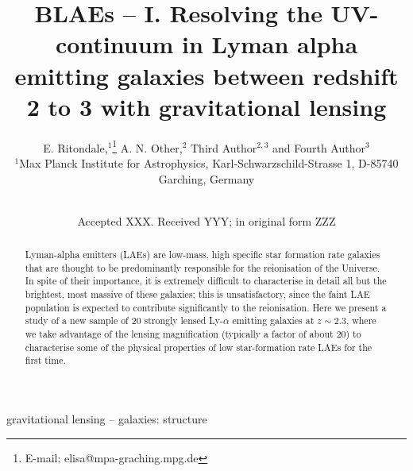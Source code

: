 \documentclass[a4paper,fleqn,usenatbib]{mnras}
\title[BLAEs -- I.]{BLAEs -- I. Resolving the UV-continuum in Lyman alpha emitting galaxies between redshift 2 to 3 with gravitational lensing}
\author[E. Ritondale et al.]{
E. Ritondale,$^{1}$\thanks{E-mail: elisa@mpa-graching.mpg.de}
A. N. Other,$^{2}$
Third Author$^{2,3}$
and Fourth Author$^{3}$
\\
$^{1}$Max Planck Institute for Astrophysics, Karl-Schwarzschild-Strasse 1, D-85740 Garching, Germany\\\\
}
\date{Accepted XXX. Received YYY; in original form ZZZ}
\begin{document}
\label{firstpage}
\pagerange{\pageref{firstpage}--\pageref{lastpage}}
\maketitle

\label{firstpage}

\begin{abstract}
Lyman-alpha emitters (LAEs) are low-mass, high specific star formation rate galaxies that are thought to be predominantly responsible for the reionisation of the Universe. In spite of their importance, it is extremely difficult to characterise in detail all but the brightest, most massive of these galaxies; this is unsatisfactory, since the faint LAE population is expected to contribute significantly to the reionisation. Here we present a study of a new sample of 20 strongly lensed Ly-$\alpha$ emitting galaxies at $z \sim 2.3$, where we take advantage of the lensing magnification (typically a factor of  about 20) to characterise some of the physical properties of low star-formation rate LAEs for the first time.

\end{abstract}
\begin{keywords}
gravitational lensing -- galaxies: structure 
\end{keywords}
\end{document}
